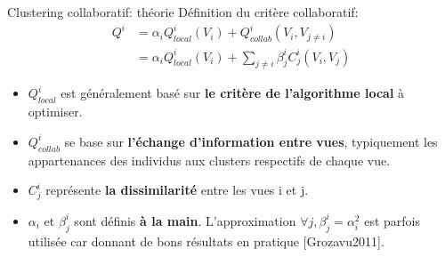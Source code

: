 \documentclass[hyperref={pdfpagelabels=false}]{beamer}
\begin{document}

    \begin{frame}{Clustering collaboratif: théorie}
        Définition du critère collaboratif:
        \begin{align}
            Q^i &= \alpha_i Q^i_{local}(V_i) + Q^i_{collab}(V_i, V_{j\neq i})\\
            &= \alpha_i Q^i_{local}(V_i) + \sum_{j\neq i} \beta^i_j C_j^i(V_i, 
            V_j)
        \end{align}
        \begin{itemize}
            \item $Q^i_{local}$ est généralement basé sur \textbf{le critère de 
                l'algorithme local} à optimiser.
            \item $Q^i_{collab}$ se base sur \textbf{l'échange d'information 
                entre vues}, typiquement les appartenances des individus aux 
                clusters respectifs de chaque vue.
            \item $C_j^i$ représente \textbf{la dissimilarité} entre les vues i 
                et j.
            \item $\alpha_i$ et $\beta_j^i$ sont définis \textbf{à la main}.  
                L'approximation $\forall j, \beta_j^i = \alpha_i^2$ est parfois 
                utilisée car donnant de bons résultats en pratique [Grozavu2011].
        \end{itemize}
    \end{frame}
\end{document}
